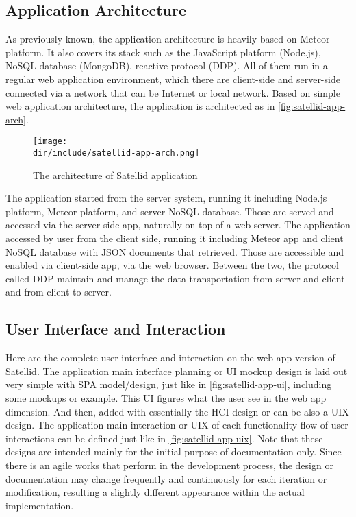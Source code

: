 \subsection{Application Architecture}

As previously known, the application architecture is heavily based on Meteor platform.
It also covers its stack such as the JavaScript platform (Node.js), NoSQL database (MongoDB), reactive protocol (DDP).
All of them run in a regular web application environment, which there are client-side and server-side connected via a network that can be Internet or local network.
Based on simple web application architecture, the application is architected as in \autoref{fig:satellid-app-arch}.

\begin{figure}[htbp]
    \centering
    \texttt{[image: \\dir/include/satellid-app-arch.png]}
    \caption[Satellid Application Architecture]{The architecture of Satellid application}
    \label{fig:satellid-app-arch}
\end{figure}

The application started from the server system, running it including Node.js platform, Meteor platform, and server NoSQL database.
Those are served and accessed via the server-side app, naturally on top of a web server.
The application accessed by user from the client side, running it including Meteor app and client NoSQL database with \ac{JSON} documents that retrieved.
Those are accessible and enabled via client-side app, via the web browser.
Between the two, the protocol called \ac{DDP} maintain and manage the data transportation from server and client and from client to server.

\subsection{User Interface and Interaction}

Here are the complete user interface and interaction on the web app version of Satellid.
The application main interface planning or \ac{UI} mockup design is laid out very simple with \ac{SPA} model/design, just like in \autoref{fig:satellid-app-ui}, including some mockups or example.
This \ac{UI} figures what the user see in the web app dimension.
And then, added with essentially the \ac{HCI} design or can be also a \ac{UIX} design.
The application main interaction or \ac{UIX} of each functionality flow of user interactions can be defined just like in \autoref{fig:satellid-app-uix}.
Note that these designs are intended mainly for the initial purpose of documentation only.
Since there is an agile works that perform in the development process, the design or documentation may change frequently and continuously for each iteration or modification, resulting a slightly different appearance within the actual implementation.

